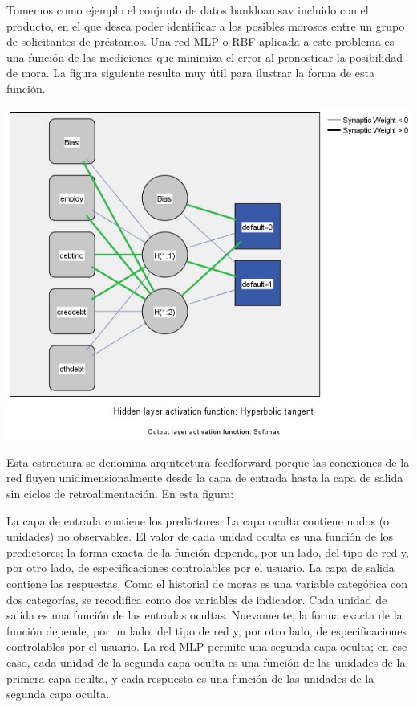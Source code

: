 \documentclass[letterpaper,12pt]{article}
\begin{document}
Tomemos como ejemplo el conjunto de datos bankloan.sav incluido con el producto, en el que desea poder identificar a los posibles morosos entre un grupo de solicitantes de préstamos. Una red MLP o RBF aplicada a este problema es una función de las mediciones que minimiza el error al pronosticar la posibilidad de mora. La figura siguiente resulta muy útil para ilustrar la forma de esta función.

\begin{center}
\includegraphics[scale = 0.5]{Imagenes/Estructura_RN.jpg}
\vspace{0.50cm}
\end{center}

Esta estructura se denomina arquitectura feedforward porque las conexiones de la red fluyen unidimensionalmente desde la capa de entrada hasta la capa de salida sin ciclos de retroalimentación. En esta figura:

La capa de entrada contiene los predictores.
La capa oculta contiene nodos (o unidades) no observables. El valor de cada unidad oculta es una función de los predictores; la forma exacta de la función depende, por un lado, del tipo de red y, por otro lado, de especificaciones controlables por el usuario.
La capa de salida contiene las respuestas. Como el historial de moras es una variable categórica con dos categorías, se recodifica como dos variables de indicador. Cada unidad de salida es una función de las entradas ocultas. Nuevamente, la forma exacta de la función depende, por un lado, del tipo de red y, por otro lado, de especificaciones controlables por el usuario.
La red MLP permite una segunda capa oculta; en ese caso, cada unidad de la segunda capa oculta es una función de las unidades de la primera capa oculta, y cada respuesta es una función de las unidades de la segunda capa oculta.
\end{document}
